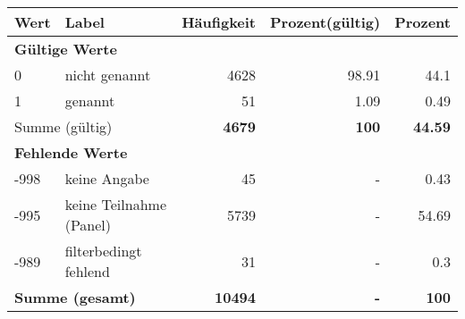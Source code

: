      \begin{longtable}{lXrrr}
     \toprule
     \textbf{Wert} & \textbf{Label} & \textbf{Häufigkeit} & \textbf{Prozent(gültig)} & \textbf{Prozent} \\
     \endhead
     \midrule
     \multicolumn{5}{l}{\textbf{Gültige Werte}}\\

     0 &
     \multicolumn{1}{X}{ nicht genannt   } &


       \num{4628} &
       \num[round-mode=places,round-precision=2]{98,91} &
         \num[round-mode=places,round-precision=2]{44,1} \\

     1 &
     \multicolumn{1}{X}{ genannt   } &


       \num{51} &
       \num[round-mode=places,round-precision=2]{1,09} &
         \num[round-mode=places,round-precision=2]{0,49} \\
     \midrule
     \multicolumn{2}{l}{Summe (gültig)} &
       \textbf{\num{4679}} &
     \textbf{100} &
       \textbf{\num[round-mode=places,round-precision=2]{44,59}} \\
     \multicolumn{5}{l}{\textbf{Fehlende Werte}}\\
       -998 &
       keine Angabe &
         \num{45} &
        - &
         \num[round-mode=places,round-precision=2]{0,43} \\
       -995 &
       keine Teilnahme (Panel) &
         \num{5739} &
        - &
         \num[round-mode=places,round-precision=2]{54,69} \\
       -989 &
       filterbedingt fehlend &
         \num{31} &
        - &
         \num[round-mode=places,round-precision=2]{0,3} \\
     \midrule
     \multicolumn{2}{l}{\textbf{Summe (gesamt)}} &
          \textbf{\num{10494}} &
        \textbf{-} &
        \textbf{100} \\
     \bottomrule
     \end{longtable}
     
